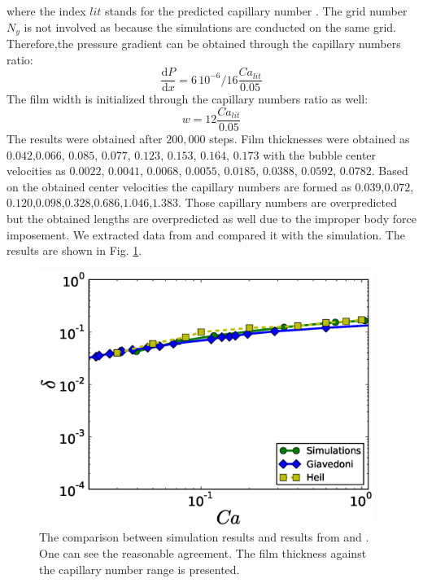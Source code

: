 \documentclass{article}
\begin{document}
where the index $lit$ stands for the predicted capillary number
\cite{giavedoni-numerical,heil-bretherton}. The grid number $N_y$ is not
involved as because the simulations are conducted on the same grid.
Therefore,the pressure gradient can be obtained through the capillary numbers
ratio:
\begin{equation}
\frac{\mathrm{d}P}{\mathrm{d} x}=6\,10^{-6}/16 \frac{Ca_{lit}}{0.05}
\end{equation}
The film width is initialized through the capillary numbers ratio as well:
\begin{equation*}
w=12 \frac{Ca_{lit}}{0.05}
\end{equation*}
The results were obtained after $200,000$ steps. Film thicknesses were obtained as $0.042$,$0.066$, $0.085$, $0.077$, $0.123$, $0.153$, $0.164$, $0.173$ with the bubble center velocities as $0.0022$, $0.0041$, $0.0068$, $0.0055$, $0.0185$, $0.0388$, $0.0592$, $0.0782$. Based on the obtained center velocities the capillary numbers 
are formed as $0.039$,$0.072$,$0.120$,$0.098$,$0.328$,$0.686$,$1.046$,$1.383$. Those capillary numbers are overpredicted but the obtained lengths are overpredicted as well due to the improper body force imposement. 
We extracted data from \cite{giavedoni-numerical,heil-bretherton} and compared it with the simulation. The results are shown in Fig. \ref{fig:capillary:comparison}.
\begin{figure}
\includegraphics[width=0.97\textwidth]{Figures/Capillary/capillaries_comparison.eps}
\caption{The comparison between simulation results and results from \cite{giavedoni-numerical} and \cite{heil-bretherton}. One can see the reasonable agreement. The film thickness against the capillary number range is presented.\label{fig:capillary:comparison}}
\end{figure}
\end{document}
